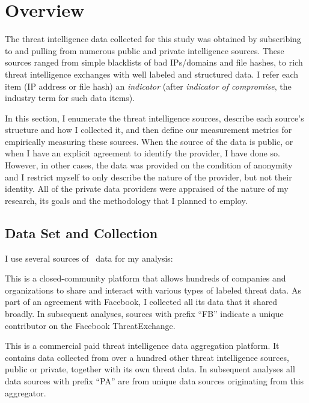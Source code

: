 \section{Overview}
\label{sec:overview}

The threat intelligence data collected for this study was obtained by
subscribing to and pulling from numerous public and private 
intelligence sources. These sources ranged from simple blacklists of 
bad IPs/domains and file hashes, to rich threat intelligence exchanges 
with well labeled and structured data.
I refer each item (\eg IP address or file hash) an \emph{indicator}
(after \emph{indicator of compromise}, the industry term for such data items).

In this section, I enumerate the threat intelligence sources, describe
each source's structure and how I collected it, and then define our
measurement metrics for empirically measuring these sources.  When the
source of the data is public, or when I have an explicit agreement to
identify the provider, I have done so.  However, in other cases, the
data was provided on the condition of anonymity and I restrict
myself to only describe the nature of the provider, but not their
identity.  All of the private data providers were appraised of the
nature of my research, its goals and the methodology that I planned
to employ.



\subsection{Data Set and Collection}

I use several sources of \ti\ data for my analysis:

    This is a closed-community platform that allows hundreds of companies and
    organizations to share and interact with various types of labeled threat data.
    As part of an agreement with Facebook, I collected all its data that it shared broadly.
    In subsequent analyses, sources with
    prefix ``FB'' indicate a unique contributor on the Facebook ThreatExchange.

 This is a commercial paid threat intelligence data aggregation
    platform. It contains data collected from over a hundred other
    threat intelligence sources, public or private, together with its own threat data.
    In subsequent analyses all data sources with prefix ``PA''
    are from unique data sources originating from this aggregator.

